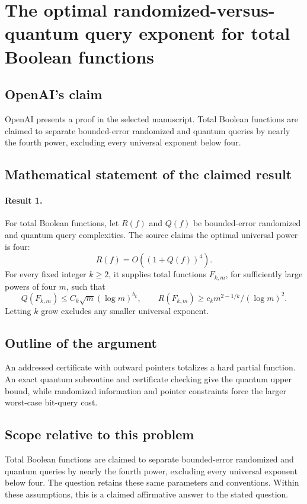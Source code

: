 \documentclass[11pt]{article}
\begin{document}
\section*{The optimal randomized-versus-quantum query exponent for total Boolean functions}

\subsection{OpenAI's claim}
OpenAI presents a proof in the selected manuscript. Total Boolean functions are claimed to separate bounded-error randomized and quantum queries by nearly the fourth power, excluding every universal exponent below four.

\subsection{Mathematical statement of the claimed result}
\paragraph{Result 1.} For total Boolean functions, let \(R(f)\) and \(Q(f)\) be bounded-error randomized and quantum query complexities. The source claims the optimal universal power is four:
\[
 R(f)=O((1+Q(f))^4).
\]
For every fixed integer \(k\ge2\), it supplies total functions \(F_{k,m}\), for sufficiently large powers of four \(m\), such that
\[
 Q(F_{k,m})\le C_k\sqrt m(\log m)^{b_k},\qquad
 R(F_{k,m})\ge c_km^{2-1/k}/(\log m)^2.
\]
Letting \(k\) grow excludes any smaller universal exponent.

\subsection{Outline of the argument}
An addressed certificate with outward pointers totalizes a hard partial function. An exact quantum subroutine and certificate checking give the quantum upper bound, while randomized information and pointer constraints force the larger worst-case bit-query cost.

\subsection{Scope relative to this problem}
Total Boolean functions are claimed to separate bounded-error randomized and quantum queries by nearly the fourth power, excluding every universal exponent below four. The question retains these same parameters and conventions. Within these assumptions, this is a claimed affirmative answer to the stated question.
\end{document}
